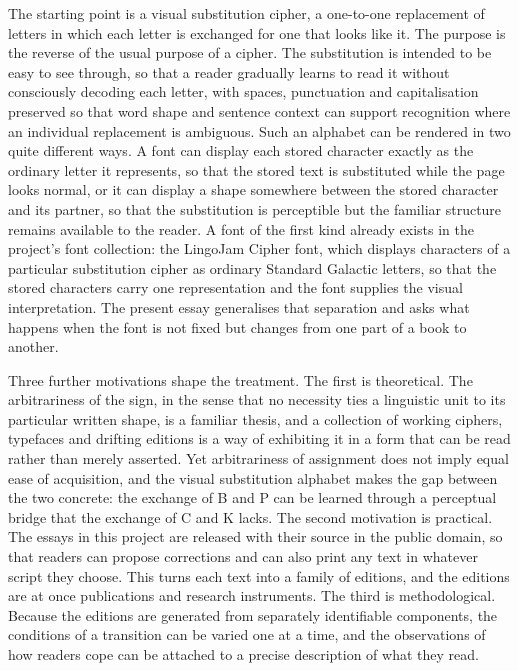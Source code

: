 The starting point is a visual substitution cipher, a one-to-one replacement of letters in which each letter is exchanged for one that looks like it. The purpose is the reverse of the usual purpose of a cipher. The substitution is intended to be easy to see through, so that a reader gradually learns to read it without consciously decoding each letter, with spaces, punctuation and capitalisation preserved so that word shape and sentence context can support recognition where an individual replacement is ambiguous. Such an alphabet can be rendered in two quite different ways. A font can display each stored character exactly as the ordinary letter it represents, so that the stored text is substituted while the page looks normal, or it can display a shape somewhere between the stored character and its partner, so that the substitution is perceptible but the familiar structure remains available to the reader. A font of the first kind already exists in the project's font collection: the LingoJam Cipher font, which displays characters of a particular substitution cipher as ordinary Standard Galactic letters, so that the stored characters carry one representation and the font supplies the visual interpretation. The present essay generalises that separation and asks what happens when the font is not fixed but changes from one part of a book to another.

Three further motivations shape the treatment. The first is theoretical. The arbitrariness of the sign, in the sense that no necessity ties a linguistic unit to its particular written shape, is a familiar thesis, and a collection of working ciphers, typefaces and drifting editions is a way of exhibiting it in a form that can be read rather than merely asserted. Yet arbitrariness of assignment does not imply equal ease of acquisition, and the visual substitution alphabet makes the gap between the two concrete: the exchange of B and P can be learned through a perceptual bridge that the exchange of C and K lacks. The second motivation is practical. The essays in this project are released with their source in the public domain, so that readers can propose corrections and can also print any text in whatever script they choose. This turns each text into a family of editions, and the editions are at once publications and research instruments. The third is methodological. Because the editions are generated from separately identifiable components, the conditions of a transition can be varied one at a time, and the observations of how readers cope can be attached to a precise description of what they read.

